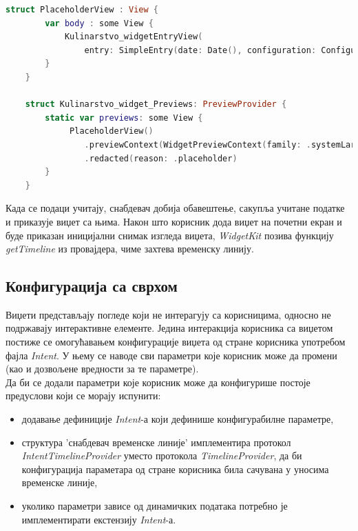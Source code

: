 \documentclass[12pt,oneside]{memoir}
\begin{document}
\begin{lstlisting}[caption=\textit{{Виџет --- placeholder}}, label={lst:виџет - placeholder}, language=Swift, frame=single]
    struct PlaceholderView : View {
        var body : some View {
            Kulinarstvo_widgetEntryView(
                entry: SimpleEntry(date: Date(), configuration: ConfigurationIntent(), recipe: Datafeed.shared.favRecipes[0], parameterToShow: MainParameter.Sastojci.rawValue))
        }
    }
    
    struct Kulinarstvo_widget_Previews: PreviewProvider {
        static var previews: some View {
             PlaceholderView()
                .previewContext(WidgetPreviewContext(family: .systemLarge))
                .redacted(reason: .placeholder)
        }
    }
\end{lstlisting}

\indent Када се подаци учитају, снабдевач добија обавештење, сакупља учитане податке и приказује виџет са њима. Након што корисник дода виџет на почетни екран и буде приказан иницијални снимак изгледа виџета, \textit{WidgetKit} позива функцију \textit{getTimeline} из провајдера, чиме захтева временску линију.

\subsection{Конфигурација са сврхом}
\label{subsec:Intent}
\indent Виџети представљају погледе који не интерагују са корисницима, односно не подржавају интерактивне елементе. Једина интеракција корисника са виџетом постиже се омогућавањем конфигурације виџета од стране корисника употребом фајла \textit{Intent}. У њему се наводе сви параметри које корисник може да промени (као и дозвољене вредности за те параметре). 
\\
\indent Да би се додали параметри које корисник може да конфигурише постоје предуслови који се морају испунити:
\begin{itemize}
    \item додавање дефиниције \textit{Intent}-а који дефинише конфигурабилне параметре,
    \item структура 'снабдевач временске линије' имплементира протокол \textit{IntentTi\-melineProvider} уместо протокола \textit{Timeli\-neProvider}, да би конфигурација параметара од стране корисника била сачувана у уносима временске линије,
    \item уколико параметри зависе од динамичких података потребно је имплементирати екстензију \textit{Intent}-а.
\end{itemize}
\end{document}
